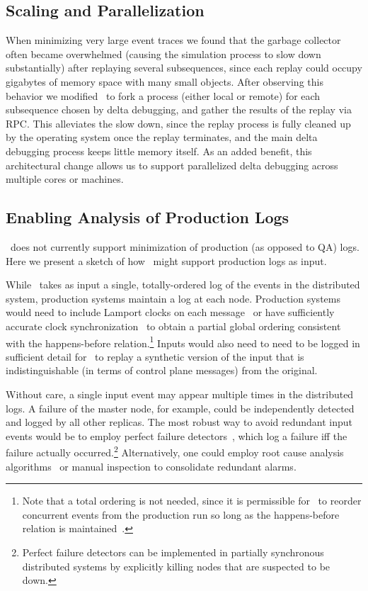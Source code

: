 \subsection{Scaling and Parallelization}

When minimizing very large event traces we found that the garbage
collector often became overwhelmed (causing the simulation process to slow down
substantially) after replaying several subsequences, since each replay could
occupy gigabytes of memory space with many small objects.
After observing this behavior we modified \projectname~to fork a process
(either local or remote) for each subsequence chosen by delta debugging,
and gather the results of the replay via RPC. This alleviates the slow down,
since the replay process is fully cleaned up by the operating system once the
replay terminates, and the
main delta debugging process keeps little memory itself.
As an added benefit, this architectural change allows us to support
parallelized delta debugging across multiple cores or machines.

\subsection{Enabling Analysis of Production Logs}

\projectname~does not currently support minimization of production (as opposed
to QA) logs.
Here we present a sketch of how \projectname~might support production logs as input.

While \simulator~takes as input a single, totally-ordered log of the events in the
distributed system, production systems maintain a log at each node.
Production systems would need to include Lamport
clocks on each message~\cite{Lamport:1978:TCO:359545.359563} or have
sufficiently accurate clock
synchronization~\cite{corbett2012spanner} to obtain a partial global ordering
consistent with the happens-before relation.\footnote{
Note that a total ordering is not needed, since it is permissible
for \simulator~to reorder concurrent events from
the production run so long as the happens-before relation is
maintained~\cite{Fischer:1985:IDC:3149.214121}.}
Inputs would also need to need to be logged in sufficient detail for \projectname~to
replay a synthetic version of the input that is indistinguishable (in terms
of control plane messages) from the original.

Without care, a single input event may appear multiple times in the
distributed logs. A failure of the master node, for example, could be independently
detected and logged by all other replicas. The most robust way to
avoid redundant input events would be to employ perfect failure
detectors~\cite{chandra1996unreliable}, which log a failure iff
the failure actually occurred.\footnote{Perfect failure detectors can be
implemented in partially synchronous distributed systems by explicitly killing
nodes that are suspected to be down.} %
Alternatively, one
could employ root cause analysis
algorithms~\cite{yemini1996} or manual inspection to consolidate redundant
alarms.

